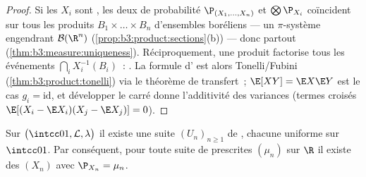 \begin{proof}
Si les $X_i$ sont , les deux  de
probabilité $\P_{(X_1,\dots,X_n)}$ et $\bigotimes\P_{X_i}$
coïncident sur tous les produits $B_1\times\dots\times B_n$
d'ensembles boréliens --- un $\pi$-système engendrant
$\mathcal B(\R^n)$ (\cref{prop:b3:product:sections}(b)) ---
donc partout (\cref{thm:b3:measure:uniqueness}).
Réciproquement, une  produit factorise tous les événements
$\bigcap_iX_i^{-1}(B_i)$~: . La formule
d' est alors Tonelli/Fubini
(\cref{thm:b3:product:tonelli}) via le théorème de
transfert~; $\E[XY] = \E X\E Y$ est le cas $g_i =
\mathrm{id}$, et développer le carré donne l'additivité des
variances (termes croisés $\E[(X_i - \E X_i)(X_j - \E X_j)]
= 0$).
\end{proof}

\begin{theorem}
\label{thm:b3:probability:existence}
Sur $\bigl(\intcc01, \mathcal L, \lambda\bigr)$ il existe une
suite $(U_n)_{n\geq1}$ de  ,
chacune uniforme sur $\intcc01$. Par conséquent, pour toute
suite de  prescrites $(\mu_n)$ sur $\R$ il existe des
$(X_n)$  avec $\P_{X_n} =
\mu_n$.
\end{theorem}

